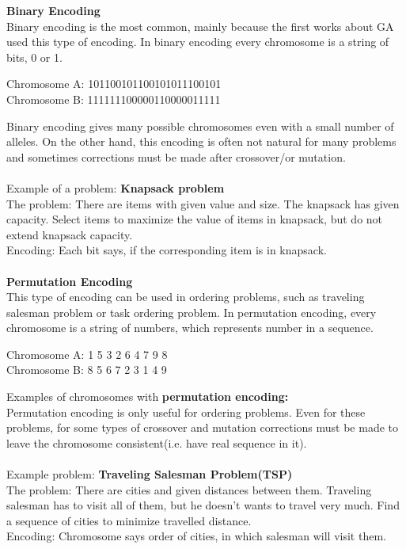 \documentclass[a4paper, 12pt]{article}
\begin{document}
\textbf{Binary Encoding}\\
Binary encoding is the most common, mainly because the first works about GA used this type of encoding. In binary encoding every chromosome is
a string of bits, 0 or 1.
\begin{center}
Chromosome A: 101100101100101011100101\\
Chromosome B: 111111100000110000011111
\end{center}
Binary encoding gives many possible chromosomes even with a small number of alleles. On the other hand, this encoding is often not natural for 
many problems and sometimes corrections must be made after crossover/or mutation.\\~\\
Example of a problem:  \textbf{Knapsack problem}\\
The problem:  There are items with given value and size. The knapsack has given capacity. Select items to maximize the value of items in 
knapsack, but do not extend knapsack capacity.\\
Encoding: Each bit says, if the corresponding item is in knapsack.\\~\\
\textbf{Permutation Encoding}\\
This type of encoding can be used in ordering problems, such as traveling salesman problem or task ordering problem. In permutation encoding,
every chromosome is a string of numbers, which represents number in a sequence.
\begin{center}
Chromosome A: 1 5 3 2 6 4 7 9 8\\
Chromosome B: 8 5 6 7 2 3 1 4 9
\end{center}
Examples of chromosomes with \textbf{permutation encoding:}\\
Permutation encoding is only useful for ordering problems. Even for these problems, for some types of crossover and mutation corrections must
be made to leave the chromosome consistent(i.e. have real sequence in it).\\~\\
Example problem: \textbf{Traveling Salesman Problem(TSP)}\\
The problem: There are cities and given distances between them. Traveling salesman has to visit all of them, but he doesn't wants to travel very much. Find a sequence of cities to minimize travelled distance.\\
Encoding: Chromosome says order of cities, in which salesman will visit them.\\~\\
\end{document}

